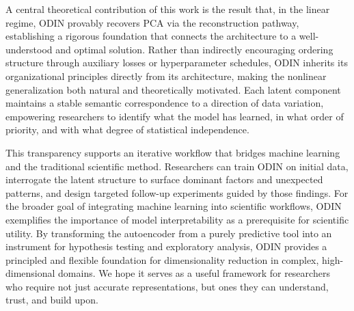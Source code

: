\documentclass[twoside,11pt]{article}
\begin{document}
A central theoretical contribution of this work is the result that, in the linear regime, ODIN provably recovers PCA via the reconstruction pathway, establishing a rigorous foundation that connects the architecture to a well-understood and optimal solution. Rather than indirectly encouraging ordering structure through auxiliary losses or hyperparameter schedules, ODIN inherits its organizational principles directly from its architecture, making the nonlinear generalization both natural and theoretically motivated. Each latent component maintains a stable semantic correspondence to a direction of data variation, empowering researchers to identify what the model has learned, in what order of priority, and with what degree of statistical independence.

This transparency supports an iterative workflow that bridges machine learning and the traditional scientific method. Researchers can train ODIN on initial data, interrogate the latent structure to surface dominant factors and unexpected patterns, and design targeted follow-up experiments guided by those findings. For the broader goal of integrating machine learning into scientific workflows, ODIN exemplifies the importance of model interpretability as a prerequisite for scientific utility. By transforming the autoencoder from a purely predictive tool into an instrument for hypothesis testing and exploratory analysis, ODIN provides a principled and flexible foundation for dimensionality reduction in complex, high-dimensional domains. We hope it serves as a useful framework for researchers who require not just accurate representations, but ones they can understand, trust, and build upon.





\vskip 0.2in


\vskip 0.2in
\appendix
\section{}
\label{app:PCA}

\end{document}
